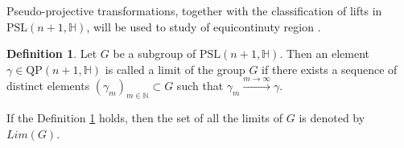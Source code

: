 \documentclass[12pt,reqno]{amsart}
\numberwithin{equation}{section}
\theoremstyle{definition}
\newtheorem{definition}[theorem]{Definition}
\def\H{\mathbb H}
\def\N{\mathbb N}
\def\P{\mathbb P}
\def\N{\mathbb {N}}
\def\H{\mathbb {H}}
\begin{document}
Pseudo-projective transformations, together with the classification of lifts in $\mathrm{PSL}(n+1,\mathbb{H})$, will be used to study of equicontinuty region .

   \begin{definition}\label{def_limit}
       Let $G$ be a subgroup of $\mathrm{PSL}(n+1,\H)$. Then an element $\gamma\in \mathrm{QP}(n+1,\H)$ is called a limit of the group $G$ if there exists a sequence of distinct elements $(\gamma_m)_{m\in \N}\subset G$ such that $\gamma_m\xrightarrow{m\rightarrow\infty} \gamma$.
   \end{definition}
   If the Definition \ref{def_limit} holds, then the set of all the limits of $G$ is denoted by $Lim(G).$
   
\end{document}
